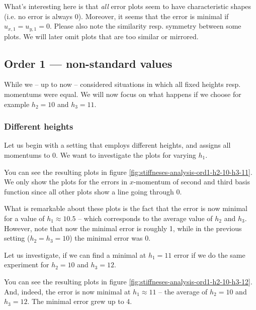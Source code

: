 \documentclass{article}
\begin{document}
What's interesting here is that \emph{all} error plots seem to have characteristic shapes (i.e. no error is always 0). Moreover, it seems that the error is minimal if $u_{x,1}=u_{y,1}=0$. Please also note the similarity resp. symmetry between some plots. We will later omit plots that are too similar or mirrored.

\clearpage{} %

\subsection{Order 1 --- non-standard values}
\label{sec:stiffness-analysis-ord1-non-std-values}

While we -- up to now -- considered situations in which all fixed heights resp. momentums were equal. We will now focus on what happens if we choose for example $h_2=10$ and $h_3=11$.

\subsubsection{Different heights}
\label{sec:stiffness-analysis-ord1-differing-h2-10-h3-11}

Let us begin with a setting that employs different heights, and assigns all momentums to 0. We want to investigate the plots for varying $h_1$.



You can see the resulting plots in figure \ref{fig:stiffneses-analysis-ord1-h2-10-h3-11}. We only show the plots for the errors in $x$-momentum of second and third basis function since all other plots show a line going through 0.

What is remarkable about these plots is the fact that the error is now minimal for a value of $h_1\approx 10.5$ -- which corresponds to the average value of $h_2$ and $h_3$. However, note that now the minimal error is roughly 1, while in the previous setting ($h_2=h_3=10$) the minimal error was 0.

Let us investigate, if we can find a minimal at $h_1=11$ error if we do the same experiment for $h_2=10$ and $h_3=12$.



You can see the resulting plots in figure \ref{fig:stiffneses-analysis-ord1-h2-10-h3-12}. And, indeed, the error is now minimal at $h_1\approx 11$ -- the average of $h_2=10$ and $h_3=12$. The minimal error grew up to 4.
\end{document}

